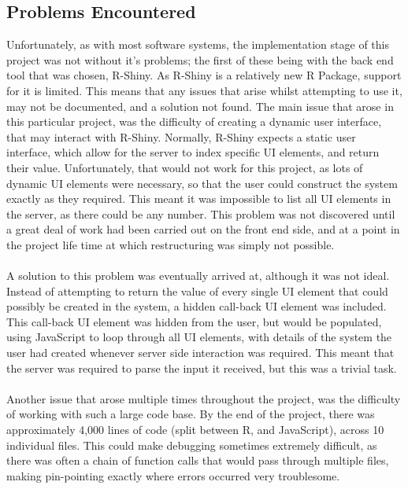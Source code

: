 \subsection{Problems Encountered}
\label{sec:pe}
Unfortunately, as with most software systems, the implementation stage of this project was not without it's problems; the first of these being with the back end tool that was chosen, R-Shiny. As R-Shiny is a relatively new R Package, support for it is limited. This means that any issues that arise whilst attempting to use it, may not be documented, and a solution not found. The main issue that arose in this particular project, was the difficulty of creating a dynamic user interface, that may interact with R-Shiny. Normally, R-Shiny expects a static user interface, which allow for the server to index specific UI elements, and return their value. Unfortunately, that would not work for this project, as lots of dynamic UI elements were necessary, so that the user could construct the system exactly as they required. This meant it was impossible to list all UI elements in the server, as there could be any number. This problem was not discovered until a great deal of work had been carried out on the front end side, and at a point in the project life time at which restructuring was simply not possible. \ \\
\ \\
A solution to this problem was eventually arrived at, although it was not ideal. Instead of attempting to return the value of every single UI element that could possibly be created in the system, a hidden call-back UI element was included. This call-back UI element was hidden from the user, but would be populated, using JavaScript to loop through all UI elements, with details of the system the user had created whenever server side interaction was required. This meant that the server was required to parse the input it received, but this was a trivial task.\ \\
\ \\
Another issue that arose multiple times throughout the project, was the difficulty of working with such a large code base. By the end of the project, there was approximately 4,000 lines of code (split between R, and JavaScript), across 10 individual files. This could make debugging sometimes extremely difficult, as there was often a chain of function calls that would pass through multiple files, making pin-pointing exactly where errors occurred very troublesome.\ \\
\ \\
